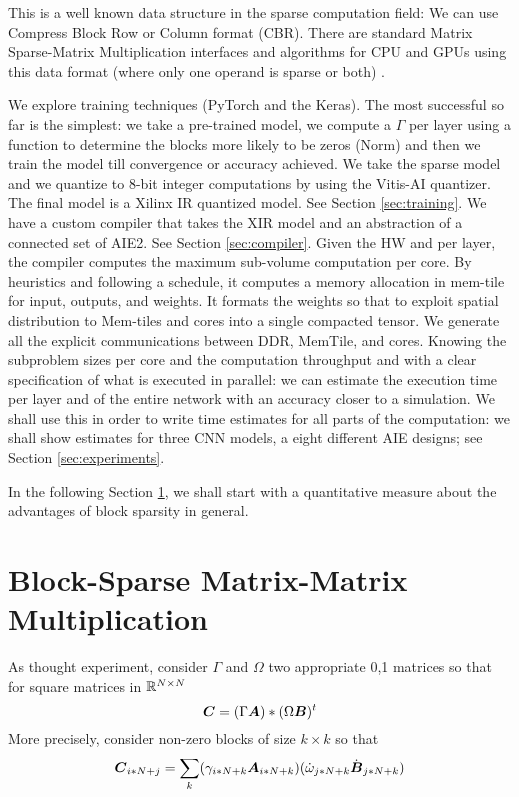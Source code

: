 \documentclass[sigconf]{acmart}
\begin{document}
This is a well known data structure in the sparse computation field:
We can use Compress Block Row or Column format (CBR). There are
standard Matrix Sparse-Matrix Multiplication interfaces and algorithms
for CPU and GPUs using this data format (where only one operand is
sparse or both) \cite{rocSPARSE,cuSPARSE}.

We explore training techniques (PyTorch and the Keras).  The most
successful so far is the simplest: we take a pre-trained model, we
compute a $\Gamma$ per layer using a function to determine the blocks
more likely to be zeros (Norm) and then we train the model till
convergence or accuracy achieved. We take the sparse model and we
quantize to 8-bit integer computations by using the Vitis-AI
quantizer. The final model is a Xilinx IR quantized model. See Section
\ref{sec:training}. We have a custom compiler that takes the XIR model
and an abstraction of a connected set of AIE2. See Section
\ref{sec:compiler}. Given the HW and per layer, the compiler computes
the maximum sub-volume computation per core. By heuristics and
following a schedule, it computes a memory allocation in mem-tile for
input, outputs, and weights. It formats the weights so that to exploit
spatial distribution to Mem-tiles and cores into a single compacted
tensor. We generate all the explicit communications between DDR,
MemTile, and cores. Knowing the subproblem sizes per core and the
computation throughput and with a clear specification of what is
executed in parallel: we can estimate the execution time per layer and
of the entire network with an accuracy closer to a simulation.  We
shall use this in order to write time estimates for all parts of the
computation: we shall show estimates for three CNN models, a eight
different AIE designs; see Section \ref{sec:experiments}.

In the following Section \ref{sec:motivation}, we shall start with a
quantitative measure about the advantages of block sparsity in
general.

\section{Block-Sparse Matrix-Matrix Multiplication}
\label{sec:motivation}

 As thought experiment, consider $\Gamma$ and $\Omega$ two appropriate
 0,1 matrices so that for square matrices in $\mathbb{R}^{N\times N}$
\begin{equation}
  {\boldsymbol C} = (\Gamma {\boldsymbol A}) * (\Omega {\boldsymbol B})^t
\end{equation}
More precisely, consider non-zero blocks of size $k\times k$ so that
\begin{equation}
  {\boldsymbol C}_{i*N+j} = \sum_k ( \gamma_{i*N+k} {\boldsymbol A}_{i*N+k} ) (\dot{\omega}_{j*N+k} \dot{{\boldsymbol B}}_{j*N+k})
\end{equation}
\end{document}
